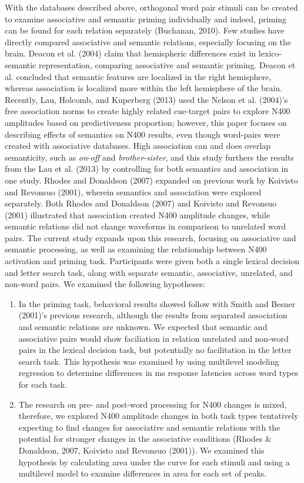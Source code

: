 \documentclass[english,man]{apa6}
\theoremstyle{definition}
\theoremstyle{definition}
\theoremstyle{remark}
\begin{document}
With the databases described above, orthogonal word pair stimuli can be
created to examine associative and semantic priming individually and
indeed, priming can be found for each relation separately (Buchanan,
2010). Few studies have directly compared associative and semantic
relations, especially focusing on the brain. Deacon et al. (2004) claim
that hemispheric differences exist in lexico-semantic representation,
comparing associative and semantic priming. Deacon et al. concluded that
semantic features are localized in the right hemisphere, whereas
association is localized more within the left hemisphere of the brain.
Recently, Lau, Holcomb, and Kuperberg (2013) used the Nelson et al.
(2004)'s free association norms to create highly related cue-target
pairs to explore N400 amplitudes based on predictiveness proportion;
however, this paper focuses on describing effects of semantics on N400
results, even though word-pairs were created with associative databases.
High association can and does overlap semanticity, such as
\emph{on}-\emph{off} and \emph{brother}-\emph{sister}, and this study
furthers the results from the Lau et al. (2013) by controlling for both
semantics and association in one study. Rhodes and Donaldson (2007)
expanded on previous work by Koivisto and Revonsuo (2001), wherein
semantics and association were explored separately. Both Rhodes and
Donaldson (2007) and Koivisto and Revonsuo (2001) illustrated that
association created N400 amplitude changes, while semantic relations did
not change waveforms in comparison to unrelated word pairs. The current
study expands upon this research, focusing on associative and semantic
processing, as well as examining the relationship between N400
activation and priming task. Participants were given both a single
lexical decision and letter search task, along with separate semantic,
associative, unrelated, and non-word pairs. We examined the following
hypotheses:

\begin{enumerate}
\def\labelenumi{\arabic{enumi})}
\item
  In the priming task, behavioral results showed follow with Smith and
  Besner (2001)'s previous research, although the results from separated
  association and semantic relations are unknown. We expected that
  semantic and associative pairs would show faciliation in relation
  unrelated and non-word pairs in the lexical decision task, but
  potentially no facilitation in the letter search task. This hypothesis
  was examined by using multilevel modeling regression to determine
  differences in ms response latencies across word types for each task.
\item
  The research on pre- and post-word processing for N400 changes is
  mixed, therefore, we explored N400 amplitude changes in both task
  types tentatively expecting to find changes for associative and
  semantic relations with the potential for stronger changes in the
  associative conditions (Rhodes \& Donaldson, 2007, Koivisto and
  Revonsuo (2001)). We examined this hypothesis by calculating area
  under the curve for each stimuli and using a multilevel model to
  examine differences in area for each set of peaks.
\end{enumerate}
\end{document}
